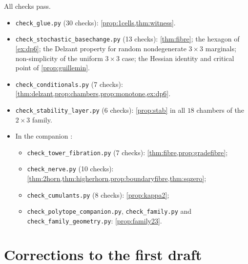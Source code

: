 \documentclass[11pt]{article}
\theoremstyle{definition}
\theoremstyle{remark}
\begin{document}
All checks pass.
\begin{itemize}[leftmargin=*]
\item \texttt{check\_glue.py} (30 checks): \cref{prop:1cells,thm:witness}.
\item \texttt{check\_stochastic\_basechange.py} (13 checks): \cref{thm:fibre}; the hexagon of \cref{ex:dp6}; the Delzant
  property for random nondegenerate $3\times3$ marginals; non-simplicity of the uniform $3\times3$ case; the Hessian
  identity and critical point of \cref{prop:guillemin}.
\item \texttt{check\_conditionals.py} (7 checks): \cref{thm:delzant,prop:chambers,prop:monotone,ex:dp6}.
\item \texttt{check\_stability\_layer.py} (6 checks): \cref{prop:stab} in all $18$ chambers of the $2\times3$ family.
\item In the companion \cite{Awasthi-Family}:
  \begin{itemize}[leftmargin=*]
  \item \texttt{check\_tower\_fibration.py} (7 checks): \cref{thm:fibre,prop:gradefibre};
  \item \texttt{check\_nerve.py} (10 checks): \cref{thm:2horn,thm:higherhorn,prop:boundaryfibre,thm:sqzero};
  \item \texttt{check\_cumulants.py} (8 checks): \cref{prop:kappa2};
  \item \texttt{check\_polytope\_companion.py}, \texttt{check\_family.py} and \texttt{check\_family\_geometry.py}:
    \cref{prop:family23}.
  \end{itemize}
\end{itemize}

\appendix
\section{Corrections to the first draft}\label{sec:corrections}
\end{document}
